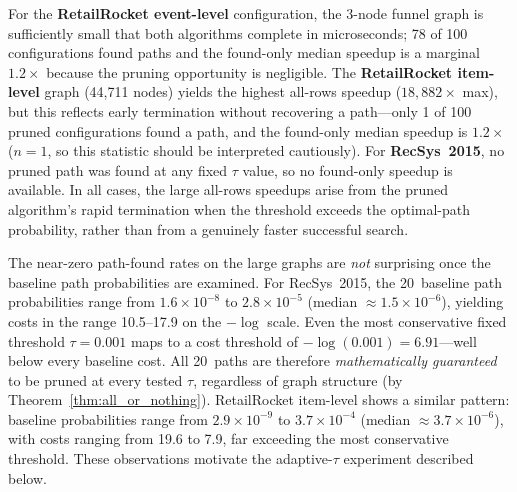 \begin{table}[htbp]
\centering
\renewcommand{\arraystretch}{1.3}
\caption[Fixed-$\tau$ real-data speedup]{Fixed-$\tau$ speedup on real-world datasets. ``All'' speedups include rows where the pruned algorithm terminated without finding a path; ``found'' is restricted to path-found rows.}
\label{table:real_data_speedup}
\end{table}

For the \textbf{RetailRocket event-level} configuration, the 3-node funnel graph is sufficiently small that both algorithms complete in microseconds; 78 of 100 configurations found paths and the found-only median speedup is a marginal $1.2\times$ because the pruning opportunity is negligible. The \textbf{RetailRocket item-level} graph (44,711 nodes) yields the highest all-rows speedup ($18{,}882\times$ max), but this reflects early termination without recovering a path---only 1 of 100 pruned configurations found a path, and the found-only median speedup is $1.2\times$ ($n=1$, so this statistic should be interpreted cautiously). For \textbf{RecSys~2015}, no pruned path was found at any fixed $\tau$ value, so no found-only speedup is available. In all cases, the large all-rows speedups arise from the pruned algorithm's rapid termination when the threshold exceeds the optimal-path probability, rather than from a genuinely faster successful search.

The near-zero path-found rates on the large graphs are \emph{not} surprising once the baseline path probabilities are examined. For RecSys~2015, the 20~baseline path probabilities range from $1.6 \times 10^{-8}$ to $2.8 \times 10^{-5}$ (median $\approx 1.5 \times 10^{-6}$), yielding costs in the range 10.5--17.9 on the $-\log$ scale. Even the most conservative fixed threshold $\tau = 0.001$ maps to a cost threshold of $-\log(0.001) = 6.91$---well below every baseline cost. All 20~paths are therefore \emph{mathematically guaranteed} to be pruned at every tested $\tau$, regardless of graph structure (by Theorem~\ref{thm:all_or_nothing}). RetailRocket item-level shows a similar pattern: baseline probabilities range from $2.9 \times 10^{-9}$ to $3.7 \times 10^{-4}$ (median $\approx 3.7 \times 10^{-6}$), with costs ranging from 19.6 to 7.9, far exceeding the most conservative threshold. These observations motivate the adaptive-$\tau$ experiment described below.

